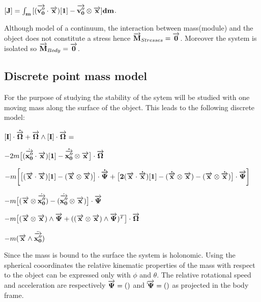 $[\bf J]= \int_{m}{[(\overrightarrow{\bf v''_{0}} \cdot \overrightarrow{\bf x})[\bf 1] - \overrightarrow{\bf v''_{0}}\otimes \overrightarrow{\bf x}]dm}$.

Although model of a continuum, the interaction between mass(module) and the object does not constitute a stress hence $\overrightarrow{\bf M}_{Stresses}=\overrightarrow{\bf 0}$. Moreover the system is isolated so $\overrightarrow{\bf M}_{Body}=\overrightarrow{\bf 0}$.

\subsection{Discrete point mass model}
\label{Discrete point mass model}
For the purpose of studying the stability of the sytem will be studied with one moving mass along the surface of the object. This leads to the following discrete model:

$[\bf I]\cdot \dot{\overrightarrow{\bf \Omega}} + \overrightarrow{\bf \Omega} \wedge [\bf I]\cdot \overrightarrow{\bf \Omega}=$

$- 2m \big [(\dot{\overrightarrow{\bf x''_{0}}} \cdot \overrightarrow{\bf x})[\bf 1] - \dot{\overrightarrow{\bf x''_{0}}}\otimes \overrightarrow{\bf x}\big ]\cdot \overrightarrow{\bf \Omega}$

$-m \bigg [ \big [(\overrightarrow{\bf x} \cdot \overrightarrow{\bf x})[\bf 1]-(\overrightarrow{\bf x} \otimes \overrightarrow{\bf x}) \big] \cdot \dot{\overrightarrow{\bf \Psi}} + \big [2(\overrightarrow{\bf x}\cdot \dot{\overrightarrow{\bf x}})[\bf 1]-(\dot{\overrightarrow{\bf x}} \otimes \overrightarrow{\bf x})-(\overrightarrow{\bf x} \otimes \dot{\overrightarrow{\bf x}}) \big ]\cdot \overrightarrow{\bf \Psi} \bigg ]$

$-m{\big [(\overrightarrow{\bf x}\otimes \dot{\overrightarrow{\bf x''_{0}}}) - (\dot{\overrightarrow{\bf x''_{0}}}\otimes \overrightarrow{\bf x}) \big ]\cdot \overrightarrow{\bf \Psi}}$

$-m {\big [(\overrightarrow{\bf x}\otimes \overrightarrow{\bf x})\wedge \overrightarrow{\bf \Psi}+((\overrightarrow{\bf x}\otimes \overrightarrow{\bf x})\wedge \overrightarrow{\bf \Psi})^{T}\big ] \cdot \overrightarrow{\bf \Omega}}$

$-m(\overrightarrow{\bf x}\wedge \ddot{\overrightarrow{\bf x''_{0}}})$


Since the mass is bound to the surface the system is holonomic. Using the spherical cooordinates the relative kinematic properties of the mass with respect to the object can be expressed only with $\phi$ and $\theta$. The relative rotational speed and acceleration are respectively $\overrightarrow{\bf \Psi}=()$ and  $\dot \dot{\overrightarrow{\bf\Psi}}=()$ as projected in the body frame.

